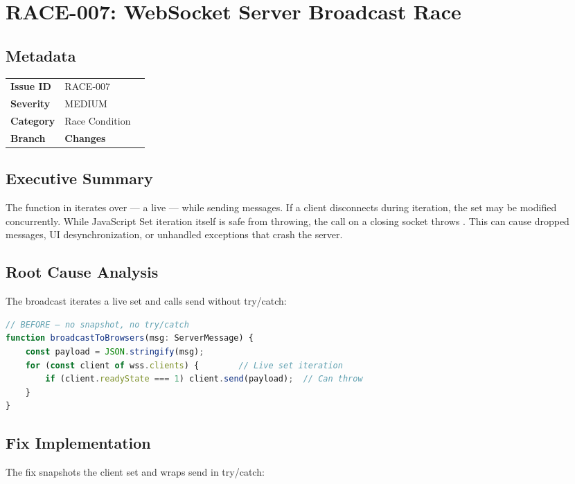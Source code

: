 \section{RACE-007: WebSocket Server Broadcast Race}
\label{sec:race-007}
\subsection*{Metadata}
\begin{tabular}{ll}
\textbf{Issue ID} & RACE-007 \\
\textbf{Severity} & MEDIUM \\
\textbf{Category} & Race Condition \\
\textbf{Branch} & 
\textbf{Changes} &  \\
\end{tabular}

\subsection*{Executive Summary}
The  function in  iterates over  — a live  — while sending messages. If a client disconnects during iteration, the set may be modified concurrently. While JavaScript Set iteration itself is safe from throwing, the  call on a closing socket throws . This can cause dropped messages, UI desynchronization, or unhandled exceptions that crash the server.

\subsection*{Root Cause Analysis}
The broadcast iterates a live set and calls send without try/catch:

\begin{lstlisting}[language=TypeScript]
// BEFORE — no snapshot, no try/catch
function broadcastToBrowsers(msg: ServerMessage) {
    const payload = JSON.stringify(msg);
    for (const client of wss.clients) {        // Live set iteration
        if (client.readyState === 1) client.send(payload);  // Can throw
    }
}
\end{lstlisting}

\subsection*{Fix Implementation}
The fix snapshots the client set and wraps send in try/catch:

